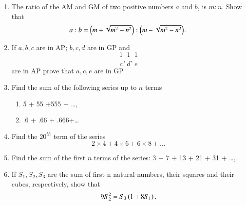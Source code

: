 \begin{enumerate}[label=\thesubsection.\arabic*.,ref=\thesubsection.\theenumi]
\item The ratio of the AM  and GM  of two positive numbers $a$ and $b$, is $m : n$. Show that 
$$a:b = \left(m+\sqrt{m^2 - n^2}\right):\left(m - \sqrt{m^2 - n^2}\right).$$
\item If $a, b, c$ are in AP; $b, c, d$ are in GP  and $$\frac{1}{c}, \frac{1}{d}, \frac{1}{e}$$ are in AP  prove that $a, c, e$ are in GP.
\item Find the sum of the following series up to $n$ terms
\begin{enumerate}
\item 5 + 55 +555 + \dots, 
\item .6 + .66 + .666+\dots 
\end{enumerate}
\item Find the $20^{th}$ term of the series $$2 \times 4 + 4 \times 6 + 6 \times 8 + \dots  $$ 
\item Find the sum of the first $n$ terms of the series: 3 + 7 + 13 + 21 + 31 + \dots, 
\item If $S_1, S_2, S_3$ are the sum of first n natural numbers, their squares and their cubes, respectively, show that $$9 S_2^2 = S_3 \left(1 + 8S_1\right).$$
\end{enumerate}
